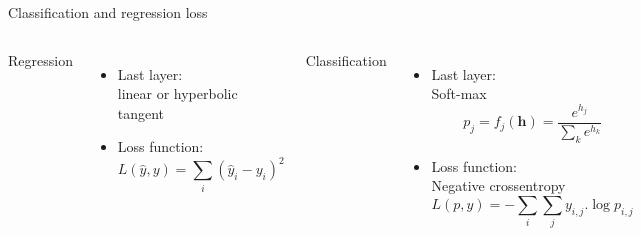 \documentclass[handout]{beamer}
\begin{document}
\begin{frame}{Classification and regression loss}
  
   \begin{columns}
   \alert{Regression}
   \begin{itemize}
       \item Last layer:\\
       linear or hyperbolic tangent
       \item Loss function:\\
       $$L(\hat{y},y) = \sum_i (\hat{y}_i-y_i)^2$$
   \end{itemize}
   \pause
{}
       \alert{Classification}
   \begin{itemize}
       \item Last layer:\\
       Soft-max
       $$
       p_j=f_j(\mathbf{h}) = \frac{e^{h_j}}{\sum_k e^{h_k}}
       $$
       
       \item Loss function:\\
       Negative crossentropy
       $$L(p,y) = -\sum_i \sum_j y_{i,j}.\log{p_{i,j}}$$
   \end{itemize}
   \end{columns}
\end{frame}
\end{document}
